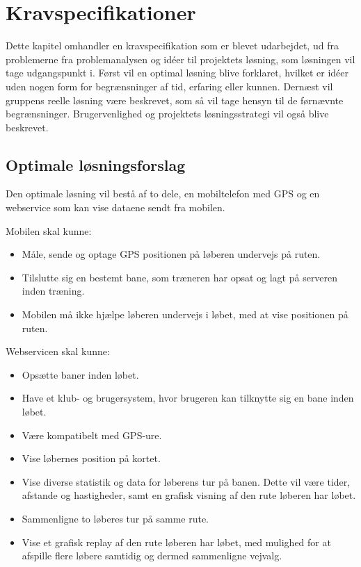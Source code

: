 \chapter{Kravspecifikationer}
Dette kapitel omhandler en kravspecifikation som er blevet udarbejdet, ud fra problemerne fra problemanalysen og idéer til projektets løsning, som løsningen vil tage udgangspunkt i. Først vil en optimal løsning blive forklaret, hvilket er idéer uden nogen form for begrænsninger af tid, erfaring eller kunnen. Dernæst vil gruppens reelle løsning være beskrevet, som så vil tage hensyn til de førnævnte begrænsninger. Brugervenlighed og projektets løsningsstrategi vil også blive beskrevet.

\section{Optimale løsningsforslag}
Den optimale løsning vil bestå af to dele, en mobiltelefon med GPS og en webservice som kan vise dataene sendt fra mobilen.

Mobilen skal kunne:
\begin{itemize}
	\item Måle, sende og optage GPS positionen på løberen undervejs på ruten.
	\item Tilslutte sig en bestemt bane, som træneren har opsat og lagt på serveren inden træning.
	\item Mobilen må ikke hjælpe løberen undervejs i løbet, med at vise positionen på ruten.
\end{itemize}

Webservicen skal kunne:
\begin{itemize}
	\item Opsætte baner inden løbet.
	\item Have et klub- og brugersystem, hvor brugeren kan tilknytte sig en bane inden løbet.
	\item Være kompatibelt med GPS-ure.
	\item Vise løbernes position på kortet.
	\item Vise diverse statistik og data for løberens tur på banen. Dette vil være tider, afstande og hastigheder, samt en grafisk visning af den rute løberen har løbet.
	\item Sammenligne to løberes tur på samme rute.
	\item Vise et grafisk replay af den rute løberen har løbet, med mulighed for at afspille flere løbere samtidig og dermed sammenligne vejvalg.
\end{itemize} 

